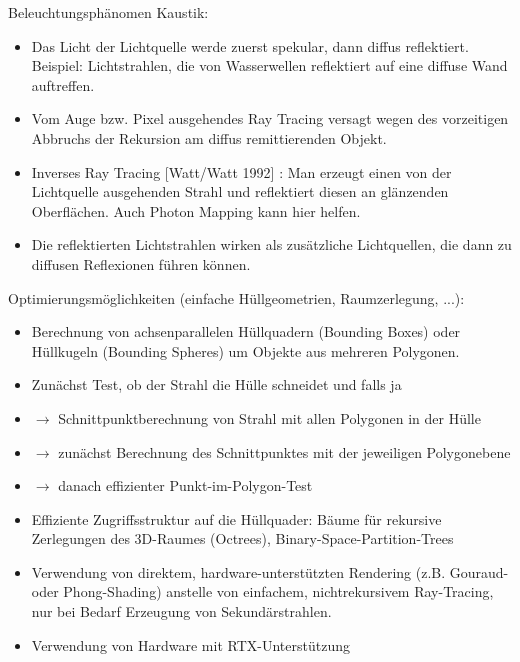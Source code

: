\documentclass[10pt,landscape]{article}
\begin{document}
\begin{multicols}{3}
{  Beleuchtungsphänomen Kaustik:
  \begin{itemize}
    \item Das Licht der Lichtquelle werde zuerst spekular, dann diffus reflektiert. Beispiel: Lichtstrahlen, die von Wasserwellen reflektiert auf eine diffuse Wand auftreffen.
    \item Vom Auge bzw. Pixel ausgehendes Ray Tracing versagt wegen des vorzeitigen Abbruchs der Rekursion am diffus remittierenden Objekt.
    \item Inverses Ray Tracing [Watt/Watt 1992] : Man erzeugt einen von der Lichtquelle ausgehenden Strahl und reflektiert diesen an glänzenden Oberflächen. Auch Photon Mapping kann hier helfen.
    \item Die reflektierten Lichtstrahlen wirken als zusätzliche Lichtquellen, die dann zu diffusen Reflexionen führen können.
  \end{itemize}
  
  Optimierungsmöglichkeiten (einfache Hüllgeometrien, Raumzerlegung, ...):
  \begin{itemize}
    \item Berechnung von achsenparallelen Hüllquadern (Bounding Boxes) oder Hüllkugeln (Bounding Spheres) um Objekte aus mehreren Polygonen.
    \item Zunächst Test, ob der Strahl die Hülle schneidet und falls ja
    \item $\rightarrow$ Schnittpunktberechnung von Strahl mit allen Polygonen in der Hülle
    \item $\rightarrow$ zunächst Berechnung des Schnittpunktes mit der jeweiligen Polygonebene
    \item $\rightarrow$ danach effizienter Punkt-im-Polygon-Test
    \item Effiziente Zugriffsstruktur auf die Hüllquader: Bäume für rekursive Zerlegungen des 3D-Raumes (Octrees), Binary-Space-Partition-Trees
    \item Verwendung von direktem, hardware-unterstützten Rendering (z.B. Gouraud- oder Phong-Shading) anstelle von einfachem, nichtrekursivem Ray-Tracing, nur bei Bedarf Erzeugung von Sekundärstrahlen.
    \item Verwendung von Hardware mit RTX-Unterstützung
  \end{itemize}
  
}
\end{multicols}
\end{document}
